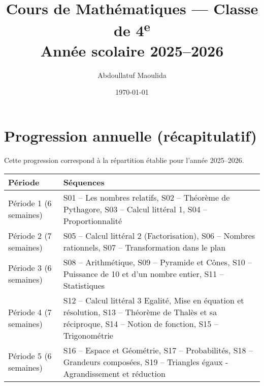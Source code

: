 \documentclass[12pt,a4paper]{book}
\title{Cours de Mathématiques — Classe de 4\textsuperscript{e}\\[0.4em]\large Année scolaire 2025–2026}
\author{Abdoullatuf Maoulida}
\date{\today}
\begin{document}
\maketitle
\tableofcontents
\cleardoublepage


\cleardoublepage
\appendix
\chapter{Progression annuelle (récapitulatif)}
Cette progression correspond à la répartition établie pour l'année 2025–2026.

\begin{center}
	\begin{tabular}{|p{2cm}|p{12cm}|}
		\hline
		\textbf{Période} & \textbf{Séquences} \\ \hline
		Période 1 (6 semaines) & S01 -- Les nombres relatifs, S02 -- Théorème de Pythagore, S03 -- Calcul littéral 1, S04 -- Proportionnalité \\ \hline
		Période 2 (7 semaines) & S05 -- Calcul littéral 2 (Factorisation), S06 -- Nombres rationnels, S07 -- Transformation dans le plan \\ \hline
		Période 3 (6 semaines) & S08 -- Arithmétique, S09 -- Pyramide et Cônes, S10 -- Puissance de 10 et d'un nombre entier, S11 -- Statistiques \\ \hline
		Période 4 (7 semaines) & S12 -- Calcul littéral 3 Egalité, Mise en équation et résolution, S13 -- Théorème de Thalès et sa réciproque, S14 -- Notion de fonction, S15 -- Trigonométrie \\ \hline
		Période 5 (6 semaines) & S16 -- Espace et Géométrie, S17 -- Probabilités, S18 -- Grandeurs composées, S19 -- Triangles égaux - Agrandissement et réduction \\ \hline
	\end{tabular}
\end{center}
\end{document}
